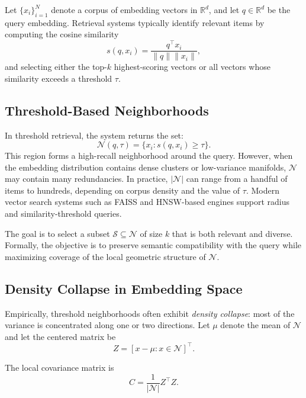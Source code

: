 \documentclass{article}
\begin{document}
Let $\{x_i\}_{i=1}^N$ denote a corpus of embedding vectors in $\mathbb{R}^d$, and let $q \in \mathbb{R}^d$ be the query embedding. Retrieval systems typically identify relevant items by computing the cosine similarity
\begin{equation}
    s(q, x_i) = \frac{q^\top x_i}{\|q\|\|x_i\|},
\end{equation}
and selecting either the top-$k$ highest-scoring vectors or all vectors whose similarity exceeds a threshold $\tau$.

\subsection{Threshold-Based Neighborhoods}
In threshold retrieval, the system returns the set:
\begin{equation}
    \mathcal{N}(q, \tau) = \{ x_i : s(q, x_i) \ge \tau \}.
\end{equation}
This region forms a high-recall neighborhood around the query. However, when the embedding distribution contains dense clusters or low-variance manifolds, $\mathcal{N}$ may contain many redundancies. In practice, $|\mathcal{N}|$ can range from a handful of items to hundreds, depending on corpus density and the value of $\tau$.
Modern vector search systems such as FAISS \cite{johnson2019billion} and HNSW-based engines \cite{malkov2018efficient} support radius and similarity-threshold queries.

The goal is to select a subset $\mathcal{S} \subseteq \mathcal{N}$ of size $k$ that is both relevant and diverse. Formally, the objective is to preserve semantic compatibility with the query while maximizing coverage of the local geometric structure of $\mathcal{N}$.

\subsection{Density Collapse in Embedding Space}
Empirically, threshold neighborhoods often exhibit \emph{density collapse}: most of the variance is concentrated along one or two directions. Let $\mu$ denote the mean of $\mathcal{N}$ and let the centered matrix be
\begin{equation}
    Z = [x - \mu : x \in \mathcal{N}]^\top.
\end{equation}

The local covariance matrix is
\begin{equation}
    C = \frac{1}{|\mathcal{N}|} Z^\top Z.
\end{equation}
\end{document}
